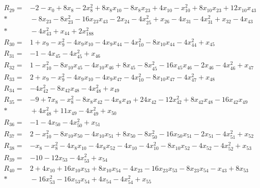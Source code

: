 \documentclass[11pt]{article}
\theoremstyle{remark}\newtheorem{remark}[theorem]{Remark}
\begin{document}
\begin{align*}
R_{29} ={}& -2 - x_{0} + 8x_{8} - 2x_{8}^{2} + 8x_{8}x_{10} - 8x_{8}x_{23} + 4x_{10} - x_{10}^{2} + 8x_{10}x_{23} + 12x_{10}x_{43} \\*
&{} - 8x_{23} - 8x_{23}^{2} - 16x_{23}x_{43} - 2x_{24} - 4x_{25}^{2} + x_{26} - 4x_{31} - 4x_{31}^{2} + x_{32} - 4x_{43} \\*
&{} - 4x_{43}^{2} + x_{44} + 2x_{188}^{2} \\[4pt]
R_{30} ={}& 1 + x_{9} - x_{9}^{2} - 4x_{9}x_{10} - 4x_{9}x_{44} - 4x_{10}^{2} - 8x_{10}x_{44} - 4x_{44}^{2} + x_{45} \\[4pt]
R_{31} ={}& -1 - 4x_{45} - 4x_{45}^{2} + x_{46} \\[4pt]
R_{32} ={}& 1 - x_{10}^{2} - 8x_{10}x_{45} - 4x_{10}x_{46} + 8x_{45} - 8x_{45}^{2} - 16x_{45}x_{46} - 2x_{46} - 4x_{46}^{2} + x_{47} \\[4pt]
R_{33} ={}& 2 + x_{9} - x_{9}^{2} - 4x_{9}x_{10} - 4x_{9}x_{47} - 4x_{10}^{2} - 8x_{10}x_{47} - 4x_{47}^{2} + x_{48} \\[4pt]
R_{34} ={}& -4x_{42}^{2} - 8x_{42}x_{48} - 4x_{48}^{2} + x_{49} \\[4pt]
R_{35} ={}& -9 + 7x_{8} - x_{8}^{2} - 8x_{8}x_{42} - 4x_{8}x_{49} + 24x_{42} - 12x_{42}^{2} + 8x_{42}x_{48} - 16x_{42}x_{49} \\*
&{} + 4x_{48}^{2} + 11x_{49} - 4x_{49}^{2} + x_{50} \\[4pt]
R_{36} ={}& -1 - 4x_{50} - 4x_{50}^{2} + x_{51} \\[4pt]
R_{37} ={}& 2 - x_{10}^{2} - 8x_{10}x_{50} - 4x_{10}x_{51} + 8x_{50} - 8x_{50}^{2} - 16x_{50}x_{51} - 2x_{51} - 4x_{51}^{2} + x_{52} \\[4pt]
R_{38} ={}& -x_{8} - x_{8}^{2} - 4x_{8}x_{10} - 4x_{8}x_{52} - 4x_{10} - 4x_{10}^{2} - 8x_{10}x_{52} - 4x_{52} - 4x_{52}^{2} + x_{53} \\[4pt]
R_{39} ={}& -10 - 12x_{53} - 4x_{53}^{2} + x_{54} \\[4pt]
R_{40} ={}& 2 + 4x_{10} + 16x_{10}x_{53} + 8x_{10}x_{54} - 4x_{23} - 16x_{23}x_{53} - 8x_{23}x_{54} - x_{43} + 8x_{53} \\*
&{} - 16x_{53}^{2} - 16x_{53}x_{54} + 4x_{54} - 4x_{54}^{2} + x_{55} \\[4pt]

\end{align*}
\end{document}
